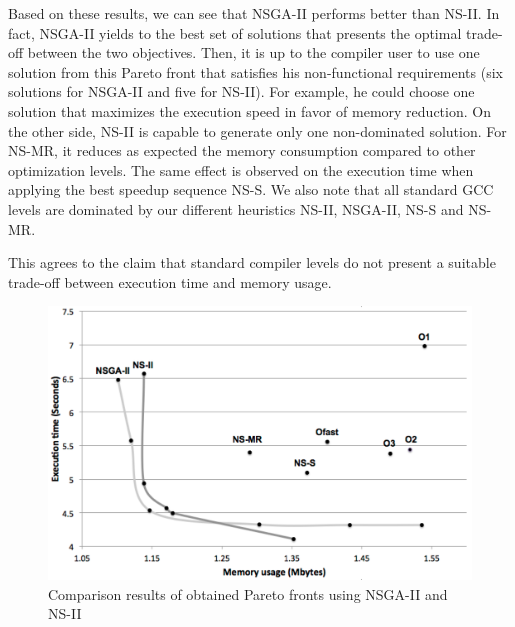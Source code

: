 Based on these results, we can see that NSGA-II performs better than NS-II. In fact, NSGA-II yields to the best set of solutions that presents the optimal trade-off between the two objectives. Then, it is up to the compiler user to use one solution from this Pareto front that satisfies his non-functional requirements (six solutions for NSGA-II and five for NS-II). 
For example, he could choose one solution that maximizes the execution speed in favor of memory reduction. 
On the other side, NS-II is capable to generate only one non-dominated solution. For NS-MR, it reduces as expected the memory consumption compared to other optimization levels. The same effect is observed on the execution time when applying the best speedup sequence NS-S. We also note that all standard GCC levels are dominated by our different heuristics NS-II, NSGA-II, NS-S and NS-MR.

This agrees to the claim that standard compiler levels do not present a suitable trade-off between execution time and memory usage.
	
\begin{figure}[h]
		\centering
		\includegraphics[width=0.9\linewidth]{chapitre3/fig/pareto.pdf}
		\caption{Comparison results of obtained Pareto fronts using NSGA-II and NS-II}
		\label{fig:pareto.pdf}
\end{figure}
	
	
\noindent{}
		
